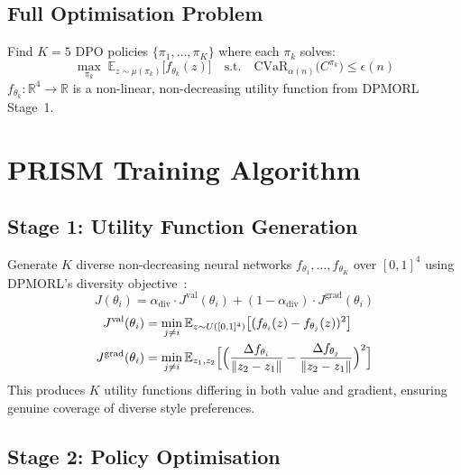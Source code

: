 \documentclass[conference]{IEEEtran}
\begin{document}
\subsection{Full Optimisation Problem}\label{sec:opt}

Find $K\!=\!5$ DPO policies $\{\pi_{1},\ldots,\pi_{K}\}$ where each
$\pi_{k}$ solves:
\begin{equation}
\max_{\pi_{k}}\;\mathbb{E}_{z\sim\mu(\pi_{k})}\bigl[f_{\theta_{k}}(z)\bigr]
\quad\text{s.t.}\quad
\text{CVaR}_{\alpha(n)}\bigl(C^{\pi_{k}}\bigr)\leq\epsilon(n)
\label{eq:fullopt}
\end{equation}
$f_{\theta_{k}}:\mathbb{R}^{4}\!\to\!\mathbb{R}$ is a non-linear,
non-decreasing utility function from DPMORL Stage~1.

\section{PRISM Training Algorithm}\label{sec:algorithm}

\subsection{Stage 1: Utility Function Generation}

Generate $K$ diverse non-decreasing neural networks
$f_{\theta_{1}},\ldots,f_{\theta_{K}}$ over $[0,1]^{4}$ using
DPMORL's diversity objective~\cite{DPMORL2023}:
\begin{equation}
J(\theta_{i})=
  \alpha_{\text{div}}\cdot J^{\text{val}}(\theta_{i})+
  (1-\alpha_{\text{div}})\cdot J^{\text{grad}}(\theta_{i})
\end{equation}
\begin{align}
J^{\text{val}}(\theta_{i})&=\min_{j\neq i}
  \mathbb{E}_{z\sim U([0,1]^{4})}
  \bigl[(f_{\theta_{i}}(z)-f_{\theta_{j}}(z))^{2}\bigr]\\
J^{\text{grad}}(\theta_{i})&=\min_{j\neq i}
  \mathbb{E}_{z_{1},z_{2}}
  \Bigl[\Bigl(\frac{\Delta f_{\theta_{i}}}{\|z_{2}-z_{1}\|}
             -\frac{\Delta f_{\theta_{j}}}{\|z_{2}-z_{1}\|}\Bigr)^{2}\Bigr]
\end{align}
This produces $K$ utility functions differing in both value and
gradient, ensuring genuine coverage of diverse style preferences.

\subsection{Stage 2: Policy Optimisation}
\end{document}
